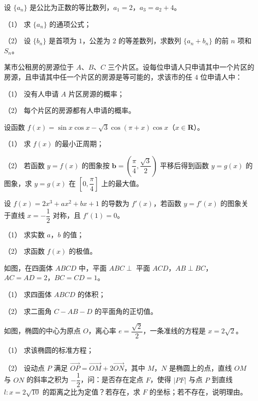 \begin{question}
设 $\{a_n\}$ 是公比为正数的等比数列，$a_1=2$，$a_3=a_2+4$。

（1） 求 $\{a_n\}$ 的通项公式；

（2） 设 $\{b_n\}$ 是首项为 $1$，公差为 $2$ 的等差数列，求数列 $\{a_n+b_n\}$ 的前 $n$ 项和 $S_n$。

\end{question}
\begin{question}
某市公租房的房源位于 $A$、$B$、$C$ 三个片区。设每位申请人只申请其中一个片区的房源，且申请其中任一个片区的房源是等可能的，求该市的任 $4$ 位申请人中：

（1） 没有人申请 $A$ 片区房源的概率；

（2） 每个片区的房源都有人申请的概率。

\end{question}
\begin{question}
设函数 $f(x)=\sin x\cos x-\sqrt3\cos(\pi+x)\cos x$（$x\in\mathbf R$）。

（1） 求 $f(x)$ 的最小正周期；

（2） 若函数 $y=f(x)$ 的图象按 $\boldsymbol b=\left(\dfrac\pi4,\dfrac{\sqrt3}2\right)$ 平移后得到函数 $y=g(x)$ 的图象，求 $y=g(x)$ 在 $\left[0,\dfrac\pi4\right]$ 上的最大值。

\end{question}
\begin{question}
设 $f(x)=2x^3+ax^2+bx+1$ 的导数为 $f'(x)$，若函数 $y=f'(x)$ 的图象关于直线 $x=-\dfrac12$ 对称，且 $f'(1)=0$。

（1） 求实数 $a$，$b$ 的值；

（2） 求函数 $f(x)$ 的极值。

\Needspace{0.4\textheight}
\end{question}
\begin{question}
如图，在四面体 $ABCD$ 中，平面 $ABC\perp$ 平面 $ACD$，$AB\perp BC$，$AC=AD=2$，$BC=CD=1$。

（1） 求四面体 $ABCD$ 的体积；

（2） 求二面角 $C-AB-D$ 的平面角的正切值。
\nopagebreak[4]
\begin{center}\end{center}
\nopagebreak[4]
\Needspace{0.4\textheight}
\end{question}
\begin{question}
如图，椭圆的中心为原点 $O$，离心率 $e=\dfrac{\sqrt2}2$，一条准线的方程是 $x=2\sqrt2$。

（1） 求该椭圆的标准方程；

（2） 设动点 $P$ 满足 $\overrightarrow{OP}=\overrightarrow{OM}+2\overrightarrow{ON}$，其中 $M$，$N$ 是椭圆上的点，直线 $OM$ 与 $ON$ 的斜率之积为 $-\dfrac12$，问：是否存在定点 $F$，使得 $|PF|$ 与点 $P$ 到直线 $l:x=2\sqrt{10}$ 的距离之比为定值？若存在，求 $F$ 的坐标；若不存在，说明理由。
\nopagebreak[4]
\begin{center}\end{center}
\nopagebreak[4]

\end{question}